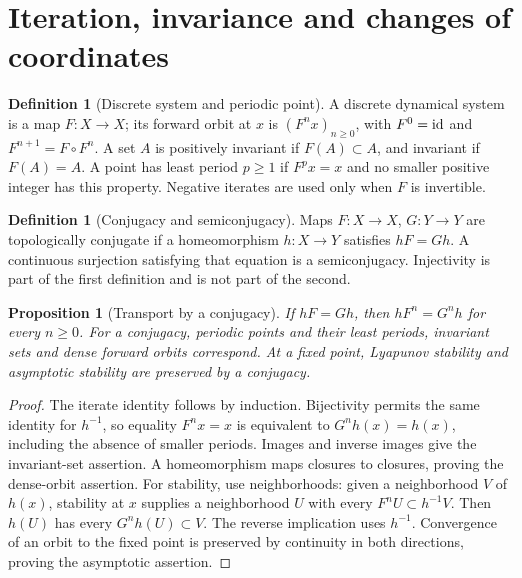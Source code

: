 \documentclass[11pt,oneside]{book}
\newtheorem{proposition}[theorem]{Proposition}
\theoremstyle{definition}
\newtheorem{definition}[theorem]{Definition}
\theoremstyle{remark}\newtheorem{remark}[theorem]{Remark}
\begin{document}
\section{Iteration, invariance and changes of coordinates}

\begin{definition}[Discrete system and periodic point]\label{d13:15:discrete-system}
A discrete dynamical system is a map \(F:X\to X\); its forward orbit at \(x\)
is \((F^n x)_{n\geq0}\), with \(F^0=\operatorname{id}\) and \(F^{n+1}=F\circ F^n\).
A set \(A\) is positively invariant if \(F(A)\subset A\), and invariant if
\(F(A)=A\). A point has least period \(p\geq1\) if \(F^p x=x\) and no
smaller positive integer has this property. Negative iterates are used only
when \(F\) is invertible.
\end{definition}

\begin{definition}[Conjugacy and semiconjugacy]\label{d13:15:conjugacy-definition}
Maps \(F:X\to X\), \(G:Y\to Y\) are topologically conjugate if a
homeomorphism \(h:X\to Y\) satisfies \(hF=Gh\). A continuous surjection
satisfying that equation is a semiconjugacy. Injectivity is part of the
first definition and is not part of the second.
\end{definition}

\begin{proposition}[Transport by a conjugacy]\label{d13:15:conjugacy-transport}
If \(hF=Gh\), then \(hF^n=G^nh\) for every \(n\geq0\). For a conjugacy,
periodic points and their least periods, invariant sets and dense forward
orbits correspond. At a fixed point, Lyapunov stability and asymptotic
stability are preserved by a conjugacy.
\end{proposition}
\begin{proof}
The iterate identity follows by induction. Bijectivity permits the same
identity for \(h^{-1}\), so equality \(F^nx=x\) is equivalent to
\(G^nh(x)=h(x)\), including the absence of smaller periods. Images and
inverse images give the invariant-set assertion. A homeomorphism maps
closures to closures, proving the dense-orbit assertion. For stability,
use neighborhoods: given a neighborhood \(V\) of \(h(x)\), stability at
\(x\) supplies a neighborhood \(U\) with every \(F^nU\subset h^{-1}V\).
Then \(h(U)\) has every \(G^nh(U)\subset V\). The reverse implication uses
\(h^{-1}\). Convergence of an orbit to the fixed point is preserved by
continuity in both directions, proving the asymptotic assertion.
\end{proof}
\end{document}

